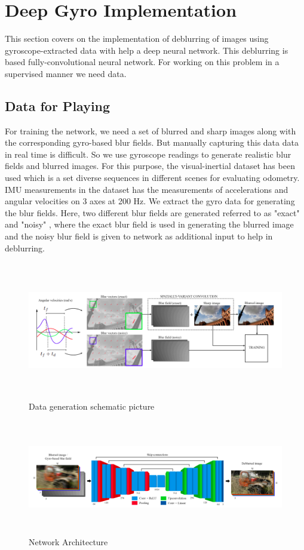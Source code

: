 \documentclass[10pt,twocolumn,letterpaper]{article}
\begin{document}
\section{Deep Gyro \cite{mustaniemi2018gyroscopeaided} Implementation}
This section covers on the implementation of deblurring of images using gyroscope-extracted data with help a deep neural network. This deblurring is based fully-convolutional neural network. For working on this problem in a supervised manner we need data.
\subsection{Data for Playing}
For training the network, we need a set of blurred and sharp images along with the corresponding gyro-based blur fields. But manually capturing this data data in real time is difficult. So we use gyroscope readings to generate realistic blur fields and blurred images. For this purpose, the visual-inertial dataset has been used which is a set diverse sequences in different scenes for evaluating odometry. IMU measurements in the dataset has the measurements of accelerations and angular velocities on 3 axes at 200 Hz. We extract the gyro data for generating the blur fields. Here, two different blur fields are generated referred to as "exact" and "noisy" , where the exact blur field is used in generating the blurred image and the noisy blur field is given to network as additional input to help in deblurring. 
\begin{figure}[h]
    \centering
    \includegraphics[width=2.2\columnwidth,height=6cm]{images/dat_gen.png}
    \caption{ Data generation schematic picture}
    \label{fig: data_generation}
\end{figure}
\begin{figure}[h]
    \centering
    \includegraphics[width=2.2\columnwidth,height=5cm]{images/architecture.png}
    \caption{ Network Architecture}
    \label{fig: result_deepgyro}
\end{figure}\\
\end{document}

